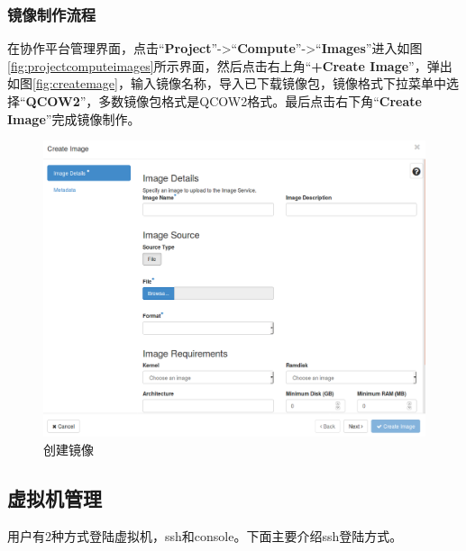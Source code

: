 \documentclass[12pt]{article}
\begin{document}
\subsubsection{镜像制作流程}
在协作平台管理界面，点击``\textbf{Project}''->``\textbf{Compute}''->``\textbf{Images}''进入如图\ref{fig:projectcomputeimages}所示界面，然后点击右上角``\textbf{+Create Image}''，弹出如图\ref{fig:createmage}，输入镜像名称，导入已下载镜像包，镜像格式下拉菜单中选择``\textbf{QCOW2}''，多数镜像包格式是QCOW2格式。最后点击右下角``\textbf{Create Image}''完成镜像制作。
\begin{figure}[!htb]
\centering
\includegraphics[width=6in]{./figures/CreateImage}
\caption{创建镜像}
\label{fig:createimage}
\end{figure}
\subsection{虚拟机管理}
用户有2种方式登陆虚拟机，ssh和console。下面主要介绍ssh登陆方式。
\end{document}
